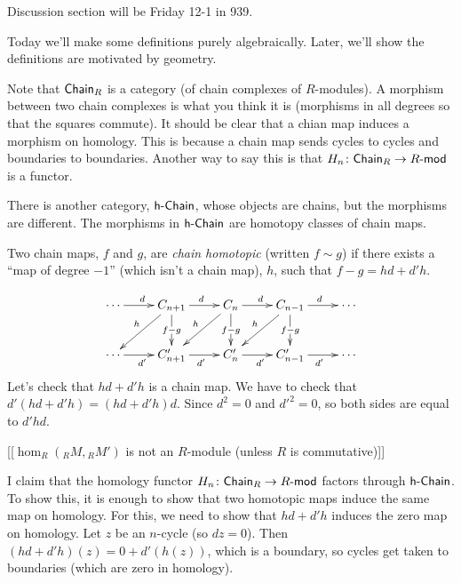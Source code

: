 
Discussion section will be Friday 12-1 in 939.

Today we'll make some definitions purely algebraically. Later, we'll show the definitions are motivated by geometry.


Note that $\text{\sf Chain}_R$ is a category (of chain complexes of $R$-modules). A morphism between two chain complexes is what you think it is (morphisms in all degrees so that the squares commute). It should be clear that a chian map induces a morphism on homology. This is because a chain map sends cycles to cycles and boundaries to boundaries. Another way to say this is that $H_n\colon \text{\sf Chain}_R\to R\textrm{-\sf mod}$ is a functor.

There is another category, $\text{\sf h-Chain}$, whose objects are chains, but the morphisms are different. The morphisms in $\text{\sf h-Chain}$ are homotopy classes of chain maps.
\begin{definition}
 Two chain maps, $f$ and $g$, are \emph{chain homotopic} (written $f\sim g$) if there exists a ``map of degree $-1$'' (which isn't a chain map), $h$, such that $f-g=hd+d'h$.
\end{definition}
\[\xymatrix{
 \cdots \ar[r]^d & C_{n+1}\ar[r]^d\ar[dl]_h \ar[d]|{f-g} & C_n \ar[dl]_h \ar[r]^d\ar[d]|{f-g} & C_{n-1} \ar[dl]_h \ar[d]|{f-g}\ar[r]^d & \cdots \\
 \cdots \ar[r]_{d'} & C'_{n+1}\ar[r]_{d'} & C'_n \ar[r]_{d'} & C'_{n-1}\ar[r]_{d'} & \cdots
}\]
Let's check that $hd+d'h$ is a chain map. We have to check that $d'(hd+d'h)=(hd+d'h)d$. Since $d^2=0$ and $d'^2=0$, so both sides are equal to $d'hd$.

[[$\hom_R({}_RM,{}_R M')$ is not an $R$-module (unless $R$ is commutative)]]

I claim that the homology functor $H_n\colon \text{\sf Chain}_R\to R\textrm{-\sf mod}$ factors through $\text{\sf h-Chain}$. To show this, it is enough to show that two homotopic maps induce the same map on homology. For this, we need to show that $hd+d'h$ induces the zero map on homology. Let $z$ be an $n$-cycle (so $dz=0$). Then $(hd+d'h)(z)=0+d'(h(z))$, which is a boundary, so cycles get taken to boundaries (which are zero in homology).

